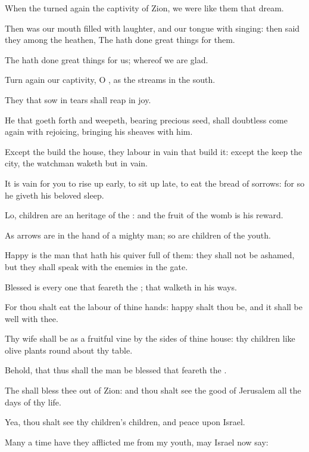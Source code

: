\Chapter
\Verse When the \LORD turned again the captivity of Zion, we were like them that dream.

\Verse Then was our mouth filled with laughter, and our tongue with singing: then said they among the heathen, The \LORD hath done great things for them.

\Verse The \LORD hath done great things for us; whereof we are glad.

\Verse Turn again our captivity, O \LORD, as the streams in the south.

\Verse They that sow in tears shall reap in joy.

\Verse He that goeth forth and weepeth, bearing precious seed, shall doubtless come again with rejoicing, bringing his sheaves with him.




\Chapter
\Verse Except the \LORD build the house, they labour in vain that build it: except the \LORD keep the city, the watchman waketh but in vain.

\Verse It is vain for you to rise up early, to sit up late, to eat the bread of sorrows: for so he giveth his beloved sleep.

\Verse Lo, children are an heritage of the \LORD: and the fruit of the womb is his reward.

\Verse As arrows are in the hand of a mighty man; so are children of the youth.

\Verse Happy is the man that hath his quiver full of them: they shall not be ashamed, but they shall speak with the enemies in the gate.




\Chapter
\Verse Blessed is every one that feareth the \LORD; that walketh in his ways.

\Verse For thou shalt eat the labour of thine hands: happy shalt thou be, and it shall be well with thee.

\Verse Thy wife shall be as a fruitful vine by the sides of thine house: thy children like olive plants round about thy table.

\Verse Behold, that thus shall the man be blessed that feareth the \LORD.

\Verse The \LORD shall bless thee out of Zion: and thou shalt see the good of Jerusalem all the days of thy life.

\Verse Yea, thou shalt see thy children's children, and peace upon Israel.




\Chapter
\Verse Many a time have they afflicted me from my youth, may Israel now say:

